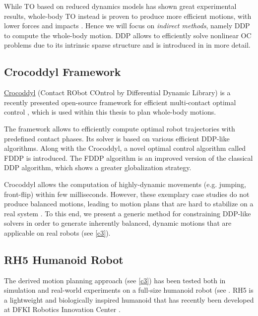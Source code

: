While \gls{TO} based on reduced dynamics models has shown great experimental results, whole-body \gls{TO} instead is proven to produce more efficient motions, with lower forces and impacts \cite{budhiraja2018differential}. Hence we will focus on \textit{indirect methods}, namely \gls{DDP} to compute the whole-body motion. \gls{DDP} allows to efficiently solve nonlinear \gls{OC} problems due to its intrinsic sparse structure and is introduced in  in more detail.

\subsection{Crocoddyl Framework} 
\href{https://github.com/loco-3d/crocoddyl#contact-robot-control-by-differential-dynamic-programming-library-crocoddyl}{Crocoddyl} (Contact RObot COntrol by Differential Dynamic Library) is a recently presented open-source framework for efficient multi-contact optimal control \cite{mastalli20crocoddyl}, which is used within this thesis to plan whole-body motions. 

The framework allows to efficiently compute optimal robot trajectories with predefined contact phases. Its solver is based on various efficient \gls{DDP}-like algorithms. Along with the Crocoddyl, a novel optimal control algorithm called \gls{FDDP} is introduced. The \gls{FDDP} algorithm is an improved version of the classical \gls{DDP} algorithm, which shows a greater globalization strategy.

Crocoddyl allows the computation of highly-dynamic movements (e.g. jumping, front-flip) within few milliseconds. However, these exemplary case studies do not produce balanced motions, leading to motion plans that are hard to stabilize on a real system \cite{giraud2020motion}. To this end, we present a generic method for constraining DDP-like solvers in order to generate inherently balanced, dynamic motions that are applicable on real robots (see \cref{c3}).    

\subsection{RH5 Humanoid Robot}\label{subsec:RH5}
The derived motion planning approach (see \cref{c3}) has been tested both in simulation and real-world experiments on a full-size humanoid robot (see . RH5 is a lightweight and biologically inspired humanoid that has recently been developed at DFKI Robotics Innovation Center \cite{peters2017konstruktion}.

